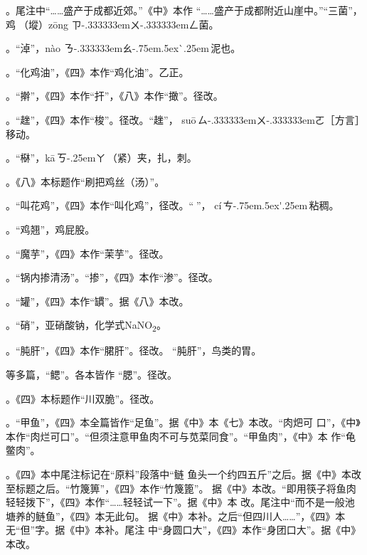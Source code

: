 \begin{list}{}
。尾注{\footnotesize{}}中“……盛产于成都近郊。”《中》本作
“……盛产于成都附近山崖中。”“三菌”，鸡𭎂（㙡）{z\={o}ng}%
{ㄗ\kern-.333333emㄨ\kern-.333333emㄥ}菌。

。“淖”，{n\`{a}o}%
{ㄋ\kern-.333333emㄠ\kern-.75em\raise.5ex\hbox{\`{}}\kern.25em}\,泥也。

。“化鸡油”，《四》本作“鸡化油”。乙正。

。“擀”，《四》本作“扞”，《八》本作“撖”。径改。

。“趖”，《四》本作“梭”。径改。“趖”，
{su\={o}}\,{ㄙ\kern-.333333emㄨ\kern-.333333emㄛ}［方言］移动。

。“㮟”，{k\={a}}\,{ㄎ\kern-.25emㄚ}\,（紧）夹，扎，刺。

。《八》本标题作“刷把鸡丝（汤）”。

。“叫花鸡”，《四》本作“叫化鸡”，径改。“𫃕”，%
{c\'{i}}\,{ㄘ\kern-.75em\raise.5ex\hbox{\'{}}\kern.25em}\,粘稠。

。“鸡翘”，鸡屁股。

。“魔芋”，《四》本作“茉芋”。径改。

。“锅内掺清汤”。“掺”，《四》本作“渗”。径改。

。“罐”，《四》本作“罆”。据《八》本改。

。“硝”，亚硝酸钠，化学式NaNO\textsubscript{2}。

。“肫肝”，《四》本作“𬂁肝”。径改。
“肫肝”，鸟类的胃。

等多篇，“鳃”。各本皆作
“腮”。径改。

。《四》本标题作“川双脆”。径改。

。“甲鱼”，《四》本全篇皆作“足鱼”。据《中》本《七》本改。“肉𤆵可
口”，《中》本作“肉烂可口”。“但须注意甲鱼肉不可与苋菜同食”。“甲鱼肉”，《中》本
作“龟鳖肉”。

。《四》本中尾注标记{\footnotesize{}}在“原料”段落中“鲢
鱼头一个约四五斤”之后。据《中》本改至标题之后。“竹篾箅”，《四》本作“竹篾篦”。
据《中》本改。“即用筷子将鱼肉轻轻拨下”，《四》本作“……轻轻试一下”。据《中》本
改。尾注{\footnotesize{}}中“而不是一般池塘养的鲢鱼”，《四》本无此句。
据《中》本补。之后“但四川人……”，《四》本无“但”字。据《中》本补。尾注
{\footnotesize{}}中“身圆口大”，《四》本作“身团口大”。据《中》本改。


\end{list}
